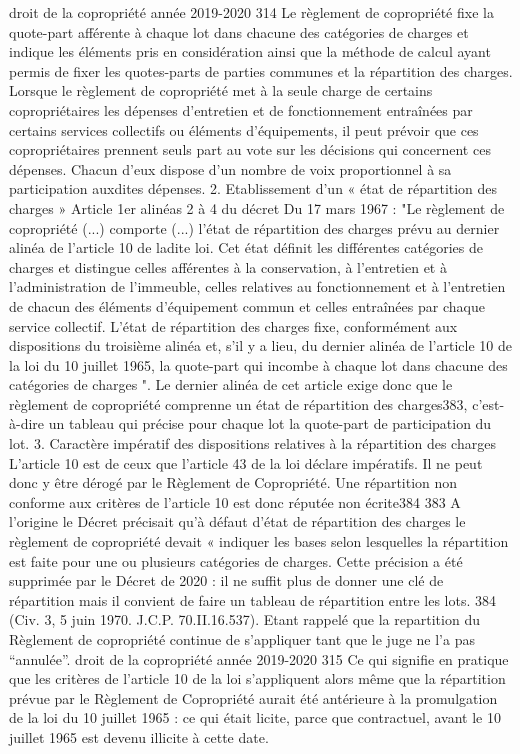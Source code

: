 		droit de la copropriété année 2019-2020
		314
		Le règlement de copropriété fixe la quote-part afférente à chaque lot dans chacune des catégories de charges et indique les éléments pris en considération ainsi que la méthode de calcul ayant permis de fixer les quotes-parts de parties communes et la répartition des charges. Lorsque le règlement de copropriété met à la seule charge de certains copropriétaires les dépenses d'entretien et de fonctionnement entraînées par certains services collectifs ou éléments d'équipements, il peut prévoir que ces copropriétaires prennent seuls part au vote sur les décisions qui concernent ces dépenses. Chacun d'eux dispose d'un nombre de voix proportionnel à sa participation auxdites dépenses.
		2. Etablissement d’un « état de répartition des charges »
		Article 1er alinéas 2 à 4 du décret Du 17 mars 1967 :
		"Le règlement de copropriété (...) comporte (...) l'état de répartition des charges prévu au dernier alinéa de l'article 10 de ladite loi.
		Cet état définit les différentes catégories de charges et distingue celles afférentes à la conservation, à l'entretien et à l'administration de l'immeuble, celles relatives au fonctionnement et à l'entretien de chacun des éléments d'équipement commun et celles entraînées par chaque service collectif.
		L'état de répartition des charges fixe, conformément aux dispositions du troisième alinéa et, s’il y a lieu, du dernier alinéa de l’article 10 de la loi du 10 juillet 1965, la quote-part qui incombe à chaque lot dans chacune des catégories de charges
		".
		Le dernier alinéa de cet article exige donc que le règlement de copropriété comprenne un état de répartition des charges383, c’est-à-dire un tableau qui précise pour chaque lot la quote-part de participation du lot.
		3. Caractère impératif des dispositions relatives à la répartition des charges
		L'article 10 est de ceux que l'article 43 de la loi déclare impératifs. Il ne peut donc y être dérogé par le Règlement de Copropriété. Une répartition non conforme aux critères de l'article 10 est donc réputée non écrite384
		383 A l’origine le Décret précisait qu’à défaut d’état de répartition des charges le règlement de copropriété devait « indiquer les bases selon lesquelles la répartition est faite pour une ou plusieurs catégories de charges. Cette précision a été supprimée par le Décret de 2020 : il ne suffit plus de donner une clé de répartition mais il convient de faire un tableau de répartition entre les lots.
		384 (Civ. 3\degres, 5 juin 1970. J.C.P. 70.II.16.537). Etant rappelé que la repartition du Règlement de copropriété continue de s’appliquer tant que le juge ne l’a pas “annulée”.
		droit de la copropriété année 2019-2020
		315
		Ce qui signifie en pratique que les critères de l'article 10 de la loi s'appliquent alors même que la répartition prévue par le Règlement de Copropriété aurait été antérieure à la promulgation de la loi du 10 juillet 1965 : ce qui était licite, parce que contractuel, avant le 10 juillet 1965 est devenu illicite à cette date.
		
